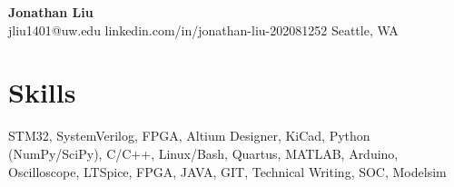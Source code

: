 \documentclass[11pt,letterpaper]{article}
\begin{document}
\begin{center}
{\LARGE \textbf{Jonathan Liu}}\\[2pt]
\small jliu1401@uw.edu \textbullet{} linkedin.com/in/jonathan-liu-202081252 \textbullet{} Seattle, WA
\end{center}
\section*{Skills}
STM32, SystemVerilog, FPGA, Altium Designer, KiCad, Python (NumPy/SciPy), C/C++, Linux/Bash, Quartus, MATLAB, Arduino, Oscilloscope, LTSpice, FPGA, JAVA, GIT, Technical Writing, SOC, Modelsim
\end{document}
